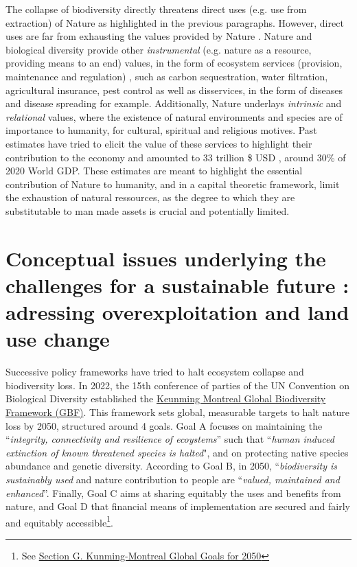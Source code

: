 The collapse of biodiversity directly threatens direct uses (e.g. use from extraction) of Nature as highlighted in the previous paragraphs. However, direct uses are far from exhausting the values provided by Nature \citep{pascual_diverse_2023}. Nature and biological diversity provide other \textit{instrumental} (e.g. nature as a resource, providing means to an end) values, in the form of ecosystem services (provision, maintenance and regulation) \citep{daily1998nature, millennium2005ecosystems}, such as carbon sequestration, water filtration, agricultural insurance, pest control as well as disservices, in the form of diseases and disease spreading for example. Additionally, Nature underlays \textit{intrinsic} and \textit{relational} values, where the existence of natural environments and species are of importance to humanity, for cultural, spiritual and religious motives. Past estimates have tried to elicit the value of these services to highlight their contribution to the economy and amounted to 33 trillion \$ USD \citep{Costanza1997}, around 30\% of 2020 World GDP. These estimates are meant to highlight the essential contribution of Nature to humanity, and in a capital theoretic framework, limit the exhaustion of natural ressources, as the degree to which they are substitutable to man made assets is crucial \citep{stiglitz_growth_74, DasguptaHeal74, solow_1991} and potentially limited. 


\section*{Conceptual issues underlying the challenges for a sustainable future : adressing overexploitation and land use change}


Successive policy frameworks have tried to halt ecosystem collapse and biodiversity loss. In 2022, the 15th conference of parties of the UN Convention on Biological Diversity established the \href{https://www.cbd.int/doc/c/e6d3/cd1d/daf663719a03902a9b116c34/cop-15-l-25-en.pdf}{Keunming Montreal Global Biodiversity Framework (GBF)}. This framework sets global, measurable targets to halt nature loss by 2050, structured around 4 goals. Goal A focuses on maintaining the ``\textit{integrity, connectivity and resilience of ecoystems}'' such that ``\textit{human induced extinction of known threatened species is halted}",  and on protecting native species abundance and genetic diversity. According to Goal B, in 2050,  ``\textit{biodiversity is sustainably used} and nature contribution to people \citep{DIAZ20151, ipbes_2022_6417333} are ``\textit{valued, maintained and enhanced}''. Finally, Goal C aims at sharing equitably  the uses and benefits from nature, and Goal D that financial means of implementation are secured and fairly and equitably accessible\footnote{See \href{https://www.cbd.int/doc/c/e6d3/cd1d/daf663719a03902a9b116c34/cop-15-l-25-en.pdf}{Section G. Kunming-Montreal Global Goals for 2050}}.

